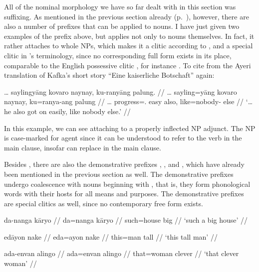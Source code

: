 All of the nominal morphology we have so far dealt with in this section was 
suffixing. As mentioned in the previous section already 
(p.~\pageref{nounprefixes}), however, there are also a number of prefixes that 
can be applied to nouns. I have just given two examples of the prefix 
 above, but  applies not only to 
nouns themselves. In fact, it rather attaches to whole NPs, which makes it a 
clitic according to \citet[117]{klavans1985}, and a special 
clitic in \citeauthor{zwicky1977}'s terminology, since no corresponding full 
form exists in its place, comparable to the English possessive clitic , 
for instance \parencites[3, 
13]{zwicky1977}[295]{zwicky1985}[510]{zwickypullum1983}. To cite from the Ayeri 
translation of Kafka's short story \enquote{Eine kaiserliche Botschaft} again:

\ex\label{ex:kukafka2}\begingl
	\gla … saylingyāng kovaro naynay, ku-ranyāng palung. //
	\glb … sayling=yāng kovaro naynay, ku=ranya-ang palung //
	\glc … progress=\TsgM{}.\Aarg{} easy also, like=nobody-\Aarg{} else //
	\glft `… he also got on easily, like nobody else.'%
	//
\endgl\xe

In this example, we can see  attaching to a properly inflected 
NP adjunct. The NP is case-marked for agent since it can be understood to refer 
to the verb  in the main clause, insofar 
 can replace 
 in the main clause.

Besides , there are also the demonstrative prefixes 
, , and , which 
have already been mentioned in the previous section as well. The demonstrative 
prefixes undergo coalescence with nouns beginning with , that is, they 
form phonological words with their hosts for all means and purposes. The 
demonstrative prefixes are special clitics as well, since no contemporary free 
form exists.

\pex
\a\begingl
	\gla da-nanga kāryo //
	\glb da=nanga kāryo //
	\glc such=house big //
	\glft `such a big house' //
\endgl

\a\begingl
	\gla edāyon nake //
	\glb eda=ayon nake //
	\glc this=man tall //
	\glft `this tall man' //
\endgl

\a\begingl
	\gla ada-envan alingo //
	\glb ada=envan alingo //
	\glc that=woman clever //
	\glft `that clever woman' //
\endgl

